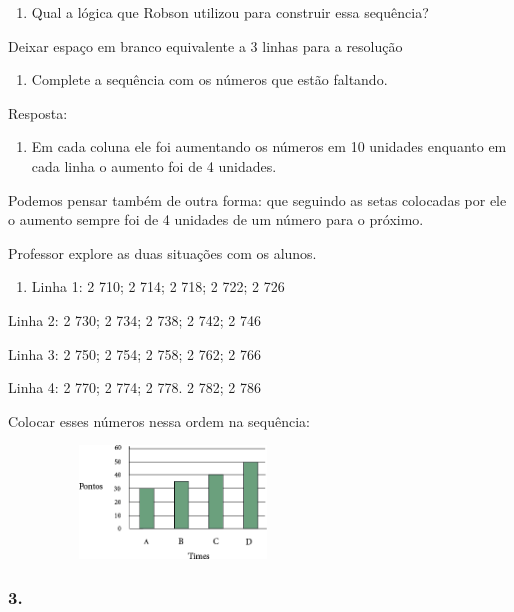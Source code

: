 \begin{enumerate}
\def\labelenumi{\alph{enumi})}
\item
  Qual a lógica que Robson utilizou para construir essa sequência?
\end{enumerate}

Deixar espaço em branco equivalente a 3 linhas para a resolução

\begin{enumerate}
\def\labelenumi{\alph{enumi})}
\item
  Complete a sequência com os números que estão faltando.
\end{enumerate}

Resposta:

\begin{enumerate}
\def\labelenumi{\alph{enumi})}
\item
  Em cada coluna ele foi aumentando os números em 10 unidades enquanto
  em cada linha o aumento foi de 4 unidades.
\end{enumerate}

Podemos pensar também de outra forma: que seguindo as setas colocadas
por ele o aumento sempre foi de 4 unidades de um número para o próximo.

Professor explore as duas situações com os alunos.

\begin{enumerate}
\def\labelenumi{\alph{enumi})}
\item
  Linha 1: 2 710; 2 714; 2 718; 2 722; 2 726
\end{enumerate}

Linha 2: 2 730; 2 734; 2 738; 2 742; 2 746

Linha 3: 2 750; 2 754; 2 758; 2 762; 2 766

Linha 4: 2 770; 2 774; 2 778. 2 782; 2 786

Colocar esses números nessa ordem na sequência:

\includegraphics[width=3.44197in,height=1.18344in]{media/image43.png}

\subsubsection{3.}\label{section-28}

